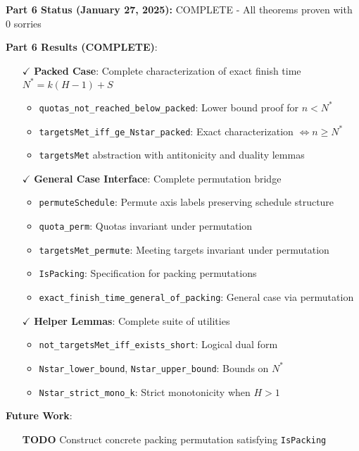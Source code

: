 \documentclass[11pt]{article}
\theoremstyle{definition}
\theoremstyle{remark}
\begin{document}
\begin{mdframed}[style=status]
\textbf{Part 6 Status (January 27, 2025):} COMPLETE - All theorems proven with 0 sorries
\end{mdframed}

\textbf{Part 6 Results (COMPLETE)}:
\begin{itemize}
\item[$\checkmark$] \textbf{Packed Case}: Complete characterization of exact finish time $N^* = k(H-1) + S$
  \begin{itemize}
  \item \texttt{quotas\_not\_reached\_below\_packed}: Lower bound proof for $n < N^*$
  \item \texttt{targetsMet\_iff\_ge\_Nstar\_packed}: Exact characterization $\Leftrightarrow n \geq N^*$
  \item \texttt{targetsMet} abstraction with antitonicity and duality lemmas
  \end{itemize}
\item[$\checkmark$] \textbf{General Case Interface}: Complete permutation bridge
  \begin{itemize}
  \item \texttt{permuteSchedule}: Permute axis labels preserving schedule structure
  \item \texttt{quota\_perm}: Quotas invariant under permutation
  \item \texttt{targetsMet\_permute}: Meeting targets invariant under permutation
  \item \texttt{IsPacking}: Specification for packing permutations
  \item \texttt{exact\_finish\_time\_general\_of\_packing}: General case via permutation
  \end{itemize}
\item[$\checkmark$] \textbf{Helper Lemmas}: Complete suite of utilities
  \begin{itemize}
  \item \texttt{not\_targetsMet\_iff\_exists\_short}: Logical dual form
  \item \texttt{Nstar\_lower\_bound}, \texttt{Nstar\_upper\_bound}: Bounds on $N^*$
  \item \texttt{Nstar\_strict\_mono\_k}: Strict monotonicity when $H > 1$
  \end{itemize}
\end{itemize}

\textbf{Future Work}:
\begin{itemize}
\item[\textbf{TODO}] Construct concrete packing permutation satisfying \texttt{IsPacking}
\end{itemize}
\end{document}
